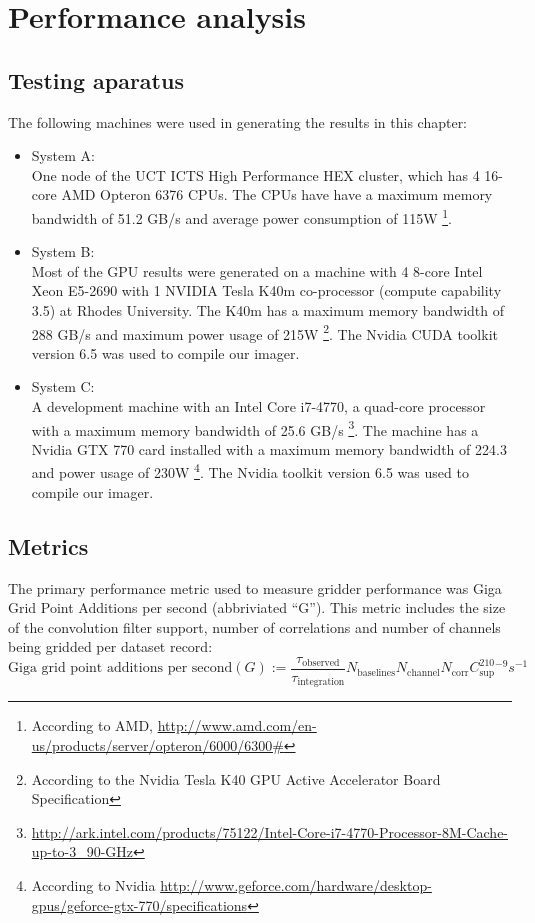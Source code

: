 \chapter{Performance analysis}
\section{Testing aparatus}
The following machines were used in generating the results in this chapter:
\begin{itemize}
 \item System A:\\
 One node of the UCT ICTS High Performance HEX cluster, which has 4 16-core AMD Opteron 6376 CPUs. The CPUs have have a maximum memory bandwidth of 
 51.2 GB/s and average power consumption of 115W \footnote{According to AMD, \url{http://www.amd.com/en-us/products/server/opteron/6000/6300\#}}.
 \item System B:\\
 Most of the GPU results were generated on a machine with 4 8-core Intel Xeon E5-2690 with 1 NVIDIA Tesla K40m co-processor (compute capability 3.5) at Rhodes University. The K40m has a maximum
 memory bandwidth of 288 GB/s and maximum power usage of 215W \footnote{According to the Nvidia Tesla K40 GPU Active Accelerator Board Specification}. The Nvidia CUDA toolkit 
 version 6.5 was used to compile our imager. 
 \item System C:\\
 A development machine with an Intel Core i7-4770, a quad-core processor with a maximum memory bandwidth of 25.6 GB/s \footnote{\url{http://ark.intel.com/products/75122/Intel-Core-i7-4770-Processor-8M-Cache-up-to-3_90-GHz}}. 
 The machine has a Nvidia GTX 770 card installed with a maximum memory bandwidth of 224.3 and power usage of 
 230W \footnote{According to Nvidia \url{http://www.geforce.com/hardware/desktop-gpus/geforce-gtx-770/specifications}}. The Nvidia toolkit version 6.5 was used to compile our imager.
\end{itemize}

\section{Metrics}
The primary performance metric used to measure gridder performance was Giga Grid Point Additions per second (abbriviated ``G''). This metric includes the size of the
convolution filter support, number of correlations and number of channels being gridded per dataset record:
\begin{equation}
 \text{Giga grid point additions per second} (G) := \frac{\tau_\text{observed}}{\tau_\text{integration}}N_\text{baselines}N_\text{channel}N_\text{corr}C_\text{sup}^210^{-9}s^{-1}
\end{equation}

